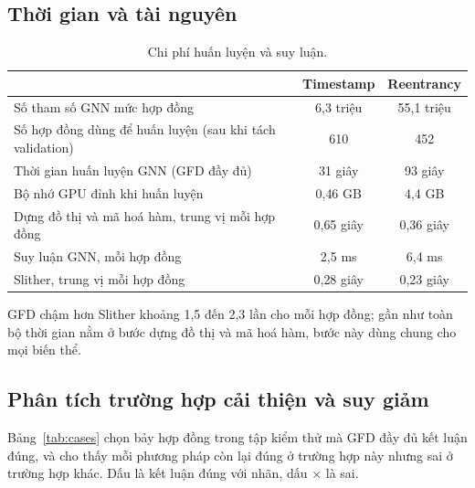 \documentclass[12pt,a4paper]{article}
\begin{document}
\subsection{Thời gian và tài nguyên}
\begin{table}[H]\centering\small
\caption{Chi phí huấn luyện và suy luận.}\label{tab:cost}
\begin{tabular}{lcc}
\toprule
 & Timestamp & Reentrancy\\
\midrule
Số tham số GNN mức hợp đồng & 6{,}3 triệu & 55{,}1 triệu\\
Số hợp đồng dùng để huấn luyện (sau khi tách validation) & 610 & 452\\
Thời gian huấn luyện GNN (GFD đầy đủ) & 31 giây & 93 giây\\
Bộ nhớ GPU đỉnh khi huấn luyện & 0{,}46 GB & 4{,}4 GB\\
Dựng đồ thị và mã hoá hàm, trung vị mỗi hợp đồng & 0{,}65 giây & 0{,}36 giây\\
Suy luận GNN, mỗi hợp đồng & 2{,}5 ms & 6{,}4 ms\\
Slither, trung vị mỗi hợp đồng & 0{,}28 giây & 0{,}23 giây\\
\bottomrule
\end{tabular}
\end{table}
GFD chậm hơn Slither khoảng 1{,}5 đến 2{,}3 lần cho mỗi hợp đồng; gần như toàn bộ thời gian nằm ở bước dựng đồ thị và mã hoá hàm, bước này dùng chung cho mọi biến thể.

\subsection{Phân tích trường hợp cải thiện và suy giảm}
Bảng~\ref{tab:cases} chọn bảy hợp đồng trong tập kiểm thử mà GFD đầy đủ kết luận đúng, và cho thấy mỗi phương pháp còn lại đúng ở trường hợp này nhưng sai ở trường hợp khác. Dấu \checkmark{} là kết luận đúng với nhãn, dấu $\times$ là sai.
\end{document}
